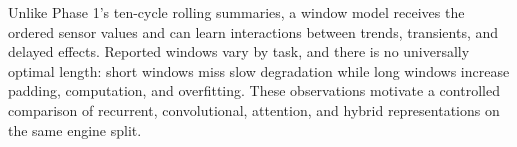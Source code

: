 Unlike Phase 1's ten-cycle rolling summaries, a window model receives the
ordered sensor values and can learn interactions between trends, transients,
and delayed effects.  Reported windows vary by task, and there is no
universally optimal length: short windows miss slow degradation while long
windows increase padding, computation, and overfitting.  These observations
motivate a controlled comparison of recurrent, convolutional, attention, and
hybrid representations on the same engine split.
